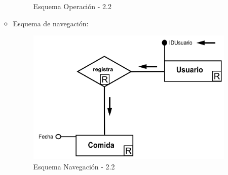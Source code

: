\documentclass[a4paper,12pt]{report}
\begin{document}
\begin{enumerate}
\begin{itemize}
\begin{figure}[!htp]
\caption{Esquema Operación - 2.2}
\label{fig:ope22}
\medskip
\footnotesize
{}
\end{figure}
\item Esquema de navegación:
\begin{figure}[!htp]
\centering
\includegraphics[width=0.7\linewidth]{./operaciones/img/Estadisticas/22_nav.png}
\caption{Esquema Navegación - 2.2}
\label{fig:nave22}
\medskip
\footnotesize
{}
\end{figure}
\end{itemize}


\end{enumerate}
\end{document}
